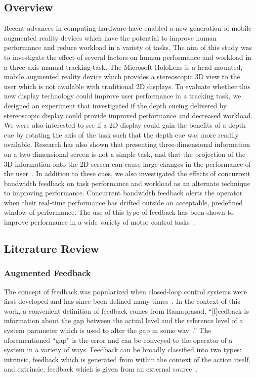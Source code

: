 \subsection{Overview}
Recent advances in computing hardware have enabled a new generation of mobile augmented reality devices which have the potential to improve human performance and reduce workload in a variety of tasks.
The aim of this study was to investigate the effect of several factors on human performance and workload in a three-axis manual tracking task.
The Microsoft HoloLens is a head-mounted, mobile augmented reality device which provides a stereoscopic 3D view to the user which is not available with traditional 2D displays.
To evaluate whether this new display technology could improve user performance in a tracking task, we designed an experiment that investigated if the depth cueing delivered by stereoscopic display could provide improved performance and decreased workload.
We were also interested to see if a 2D display could gain the benefits of a depth cue by rotating the axis of the task such that the depth cue was more readily available.
Research has also shown that presenting three-dimensional information on a two-dimensional screen is not a simple task, and that the projection of the 3D information onto the 2D screen can cause large changes in the performance of the user~\citep{kim_quantitative_1987}.
In addition to these cues, we also investigated the effects of concurrent bandwidth feedback on task performance and workload as an alternate technique to improving performance.
Concurrent bandwidth feedback alerts the operator when their real-time performance has drifted outside an acceptable, predefined window of performance.
The use of this type of feedback has been shown to improve performance in a wide variety of motor control tasks~\citep{salmoni_knowledge_1984,sigrist_augmented_2013,karasinski_real-time_2017}.

\subsection{Literature Review}
\subsubsection{Augmented Feedback}
The concept of feedback was popularized when closed-loop control systems were first developed and has since been defined many times~\citep{Wierner1948}.
In the context of this work, a convenient definition of feedback comes from Ramaprasad, ``[f]eedback is information about the gap between the actual level and the reference level of a system parameter which is used to alter the gap in some way~\citep{ramaprasad_definition_1983}.''
The aforementioned ``gap'' is the error and can be conveyed to the operator of a system in a variety of ways.
Feedback can be broadly classified into two types: intrinsic, feedback which is generated from within the context of the action itself, and extrinsic, feedback which is given from an external source~\citep{laurillard_rethinking_2002}.

